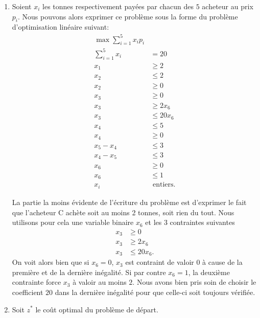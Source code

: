 \begin{enumerate}
    \begin{solution}
      \begin{enumerate}
        \item Soient $x_i$ les tonnes respectivement payées par chacun des $5$
          acheteur au prix $p_i$.
          Nous pouvons alors exprimer ce problème sous la forme du problème
          d'optimisation linéaire suivant:
          \begin{align*}
            \max \sum_{i=1}^5 x_i p_i\\
            \sum_{i=1}^5 x_i & = 20\\
            x_1 & \geq 2\\
            x_2 & \leq 2\\
            x_2 & \geq 0\\
            x_3 & \geq 0\\
            x_3 & \geq 2x_6\\
            x_3 & \leq 20x_6\\
            x_4 & \leq 5\\
            x_4 & \geq 0\\
            x_5-x_4 & \leq 3\\
            x_4-x_5 & \leq 3\\
            x_6 & \geq 0\\
            x_6 & \leq 1\\
            x_i & \text{ entiers}.
          \end{align*}

          La partie la moins évidente de l'écriture du problème est d'exprimer
          le fait que l'acheteur C achète soit au moins 2 tonnes,
          soit rien du tout.
          Nous utilisons pour cela une variable binaire $x_6$ et
          les 3 contraintes suivantes
          \begin{align*}
            x_3 & \geq 0\\
            x_3 & \geq 2x_6\\
            x_3 & \leq 20x_6.
          \end{align*}
          On voit alors bien que si $x_6 = 0$,
          $x_3$ est contraint de valoir $0$ à cause de la première et
          de la dernière inégalité.
          Si par contre $x_6 = 1$,
          la deuxième contrainte force $x_3$ à valoir au moins $2$.
          Nous avons bien pris soin de choisir le coefficient $20$
          dans la dernière inégalité pour que celle-ci soit toujours vérifiée.
        \item Soit $z^*$ le coût optimal du problème de départ.


\end{enumerate}
\end{solution}
\end{enumerate}
